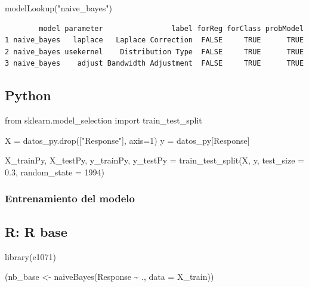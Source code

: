 \documentclass[
  letterpaper,
  DIV=11,
  numbers=noendperiod]{scrartcl}
\newenvironment{Shaded}{\begin{snugshade}}{\end{snugshade}}
\newcommand{\AttributeTok}[1]{\textcolor[rgb]{0.40,0.45,0.13}{#1}}
\newcommand{\DecValTok}[1]{\textcolor[rgb]{0.68,0.00,0.00}{#1}}
\newcommand{\FloatTok}[1]{\textcolor[rgb]{0.68,0.00,0.00}{#1}}
\newcommand{\FunctionTok}[1]{\textcolor[rgb]{0.28,0.35,0.67}{#1}}
\newcommand{\ImportTok}[1]{\textcolor[rgb]{0.00,0.46,0.62}{#1}}
\newcommand{\NormalTok}[1]{\textcolor[rgb]{0.00,0.23,0.31}{#1}}
\newcommand{\OperatorTok}[1]{\textcolor[rgb]{0.37,0.37,0.37}{#1}}
\newcommand{\OtherTok}[1]{\textcolor[rgb]{0.00,0.23,0.31}{#1}}
\newcommand{\SpecialCharTok}[1]{\textcolor[rgb]{0.37,0.37,0.37}{#1}}
\newcommand{\StringTok}[1]{\textcolor[rgb]{0.13,0.47,0.30}{#1}}
\begin{document}
\begin{Shaded}
\begin{Highlighting}[]
\FunctionTok{modelLookup}\NormalTok{(}\StringTok{"naive\_bayes"}\NormalTok{)}
\end{Highlighting}
\end{Shaded}

\begin{verbatim}
        model parameter                label forReg forClass probModel
1 naive_bayes   laplace   Laplace Correction  FALSE     TRUE      TRUE
2 naive_bayes usekernel    Distribution Type  FALSE     TRUE      TRUE
3 naive_bayes    adjust Bandwidth Adjustment  FALSE     TRUE      TRUE
\end{verbatim}

\subsection{Python}

\begin{Shaded}
\begin{Highlighting}[]
\ImportTok{from}\NormalTok{ sklearn.model\_selection }\ImportTok{import}\NormalTok{ train\_test\_split}

\NormalTok{X }\OperatorTok{=}\NormalTok{ datos\_py.drop([}\StringTok{"Response"}\NormalTok{], axis}\OperatorTok{=}\DecValTok{1}\NormalTok{)}
\NormalTok{y }\OperatorTok{=}\NormalTok{ datos\_py[}\StringTok{\textquotesingle{}Response\textquotesingle{}}\NormalTok{]}

\NormalTok{X\_trainPy, X\_testPy, y\_trainPy, y\_testPy }\OperatorTok{=}\NormalTok{ train\_test\_split(X, y, test\_size }\OperatorTok{=} \FloatTok{0.3}\NormalTok{, random\_state }\OperatorTok{=} \DecValTok{1994}\NormalTok{)}
\end{Highlighting}
\end{Shaded}

\subsubsection{Entrenamiento del
modelo}\label{entrenamiento-del-modelo-2}

\subsection{R: R base}

\begin{Shaded}
\begin{Highlighting}[]
\FunctionTok{library}\NormalTok{(e1071)}

\NormalTok{(nb\_base }\OtherTok{\textless{}{-}} \FunctionTok{naiveBayes}\NormalTok{(Response }\SpecialCharTok{\textasciitilde{}}\NormalTok{ ., }\AttributeTok{data =}\NormalTok{ X\_train))}
\end{Highlighting}
\end{Shaded}
\end{document}
